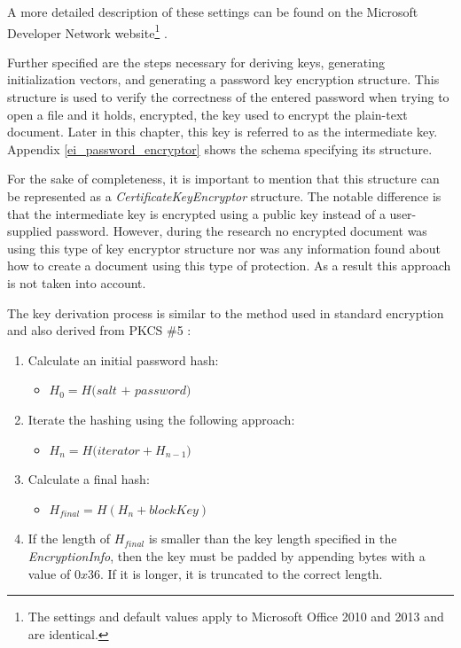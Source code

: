 \documentclass[11pt,oneside]{fithesis2}
\begin{document}
A more detailed description of these settings can be found on the Microsoft Developer Network website\footnote{The settings and default values apply to Microsoft Office 2010 and 2013 and are identical.} \cite{plan_office_crypto}. 

Further specified are the steps necessary for deriving keys, generating initialization vectors, and generating a password key encryption structure. This structure is used to verify the correctness of the entered password when trying to open a file and it holds, encrypted, the key used to encrypt the plain-text document. Later in this chapter, this key is referred to as the intermediate key. Appendix \ref{ei_password_encryptor} shows the schema specifying its structure.

For the sake of completeness, it is important to mention that this structure can be represented as a \textit{CertificateKeyEncryptor} structure. The notable difference is that the intermediate key is encrypted using a public key instead of a user-supplied password. However, during the research no encrypted document was using this type of key encryptor structure nor was any information found about how to create a document using this type of protection. As a result this approach is not taken into account.

The key derivation process is similar to the method used in standard encryption and also derived from PKCS \#5 \cite{rfc2898}:

\begin{enumerate}
\item{Calculate an initial password hash:}
	\begin{itemize}
		\item{$H_0 =\textit{H(salt + password)}$}
	\end{itemize}
\item{Iterate the hashing using the following approach:}
	\begin{itemize}
		\item{$H_n = \textit{H(iterator} + H_{n-1})$}
	\end{itemize}
\item{Calculate a final hash:}
	\begin{itemize}
		\item{$H_{final} = \textit{H}(H_n + blockKey)$}
	\end{itemize}
\item{If the length of $H_{final}$ is smaller than the key length specified in the \textit{EncryptionInfo}, then the key must be padded by appending bytes with a value of $0x36$. If it is longer, it is truncated to the correct length.}
\end{enumerate}
\end{document}
